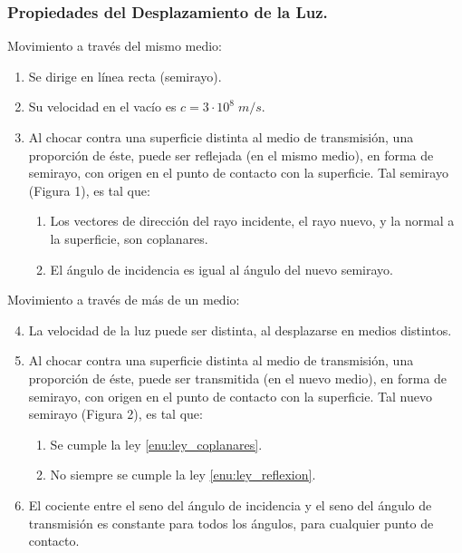 \documentclass[12pt,a4paper]{article}
\begin{document}
\subsubsection{Propiedades del Desplazamiento de la Luz.} %
\label{subs:propiedades_luz}
\begin{minipage}{0.5\linewidth}
	Movimiento a través del mismo medio:
	\begin{enumerate}[noitemsep]
		\item Se dirige en línea recta (semirayo).
		\item Su velocidad en el vacío es \(c=3 \cdot 10^8\;m/s\).
		\item Al chocar contra una superficie distinta al medio de transmisión, una proporción de éste, puede ser reflejada (en el mismo medio), en forma de semirayo, con origen en el punto de contacto con la superficie. Tal semirayo (Figura 1), es tal que:
			\begin{enumerate}
				\item Los vectores de dirección del rayo incidente, el rayo nuevo, y la normal a la superficie, son coplanares. \label{enu:ley_coplanares}
				\item El ángulo de incidencia es igual al ángulo del nuevo semirayo. \label{enu:ley_reflexion}
			\end{enumerate}
	\end{enumerate}
	\vspace{2mm}
\end{minipage}\hspace{5mm}
\begin{minipage}{0.5\linewidth}
	Movimiento a través de más de un medio:
	\begin{enumerate}[noitemsep]
			\setcounter{enumi}{3}
		\item La velocidad de la luz puede ser distinta, al desplazarse en medios distintos.
		\item Al chocar contra una superficie distinta al medio de transmisión, una proporción de éste, puede ser transmitida (en el nuevo medio), en forma de semirayo, con origen en el punto de contacto con la superficie. Tal nuevo semirayo (Figura 2), es tal que:
			\begin{enumerate}
				\item Se cumple la ley \ref{enu:ley_coplanares}.
				\item No siempre se cumple la ley \ref{enu:ley_reflexion}. \label{enu:snell_1}
			\end{enumerate}
		\item El cociente entre el seno del ángulo de incidencia y el seno del ángulo de transmisión es constante para todos los ángulos, para cualquier punto de contacto. \label{enu:snell_2}
	\end{enumerate}
\end{minipage} \vspace{-5mm}
\end{document}
